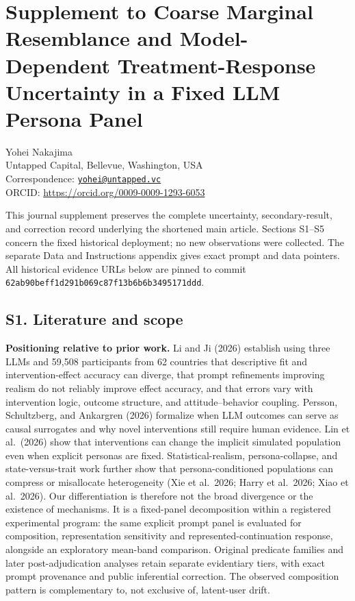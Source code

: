 \documentclass[11pt]{article}
\begin{document}
\section{Supplement to Coarse Marginal Resemblance and Model-Dependent
Treatment-Response Uncertainty in a Fixed LLM Persona
Panel}\label{supplement-to-coarse-marginal-resemblance-and-model-dependent-treatment-response-uncertainty-in-a-fixed-llm-persona-panel}

Yohei Nakajima\\
Untapped Capital, Bellevue, Washington, USA\\
Correspondence:
\href{mailto:yohei@untapped.vc}{\nolinkurl{yohei@untapped.vc}}\\
ORCID: \url{https://orcid.org/0009-0009-1293-6053}

This journal supplement preserves the complete uncertainty,
secondary-result, and correction record underlying the shortened main
article. Sections S1--S5 concern the fixed historical deployment; no new
observations were collected. The separate Data and Instructions appendix
gives exact prompt and data pointers. All historical evidence URLs below
are pinned to commit
\nolinkurl{62ab90beff1d291b069c87f13b6b6b3495171ddd}.

\subsection{S1. Literature and scope}\label{s1.-literature-and-scope}

\textbf{Positioning relative to prior work.} Li and Ji (2026) establish
using three LLMs and 59,508 participants from 62 countries that
descriptive fit and intervention-effect accuracy can diverge, that
prompt refinements improving realism do not reliably improve effect
accuracy, and that errors vary with intervention logic, outcome
structure, and attitude--behavior coupling. Persson, Schultzberg, and
Ankargren (2026) formalize when LLM outcomes can serve as causal
surrogates and why novel interventions still require human evidence. Lin
et al.~(2026) show that interventions can change the implicit simulated
population even when explicit personas are fixed. Statistical-realism,
persona-collapse, and state-versus-trait work further show that
persona-conditioned populations can compress or misallocate
heterogeneity (Xie et al.~2026; Harry et al.~2026; Xiao et al.~2026).
Our differentiation is therefore not the broad divergence or the
existence of mechanisms. It is a fixed-panel decomposition within a
registered experimental program: the same explicit prompt panel is
evaluated for composition, representation sensitivity and
represented-continuation response, alongside an exploratory mean-band
comparison. Original predicate families and later post-adjudication
analyses retain separate evidentiary tiers, with exact prompt provenance
and public inferential correction. The observed composition pattern is
complementary to, not exclusive of, latent-user drift.
\end{document}
